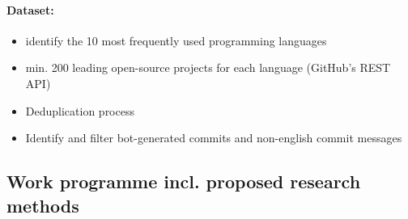 \documentclass[11pt]{article}
\begin{document}
\paragraph {Dataset:}
\begin{itemize}
\item identify the 10 most frequently used programming languages \cite{midnight2024}
\item min. 200 leading open-source projects for each language (GitHub’s REST API)
\item Deduplication process
\item Identify and filter bot-generated commits and non-english commit messages 
\end{itemize}

\newcommand{\WPone}{How consistently are conventional commits applied?}
\newcommand{\WPtwo}{Analyzing the distribution and frequency of commit types}
\newcommand{\WPthree}{What impact do conventional commits have on the maintainability of software projects?}

\subsection{Work programme incl. proposed research methods}
\label{subsec-workprogram}

\let\oldthesubsection=\thesubsection
\def\thesubsection{WP\arabic{wp}}
\def\package#1{\addtocounter{wp}{1}\subsection{#1}}

\let\oldthesubsubsection=\thesubsubsection
\def\thesubsubsection{\thesubsection.\arabic{subsubsection}}
\let\task=\subsubsection
\end{document}
